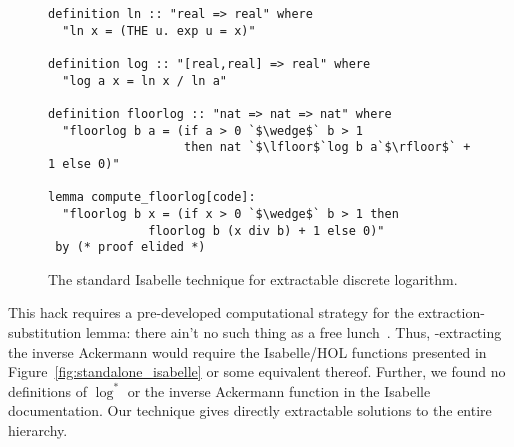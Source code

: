 \begin{figure}
\begin{lstlisting}
definition ln :: "real => real" where
  "ln x = (THE u. exp u = x)"

definition log :: "[real,real] => real" where
  "log a x = ln x / ln a"

definition floorlog :: "nat => nat => nat" where
  "floorlog b a = (if a > 0 `$\wedge$` b > 1 
                   then nat `$\lfloor$`log b a`$\rfloor$` + 1 else 0)"

lemma compute_floorlog[code]:
  "floorlog b x = (if x > 0 `$\wedge$` b > 1 then 
              floorlog b (x div b) + 1 else 0)"
 by (* proof elided *)
\end{lstlisting}
\caption{The standard Isabelle technique for extractable discrete logarithm.}
\label{fig:isabelle_hack}
\end{figure}

This hack requires a pre-developed computational strategy 
for the \li{[code]} extraction-substitution lemma: there ain't no such thing 
as a free lunch~\cite{moonmistress}. Thus, \li{[code]}-extracting the inverse 
Ackermann would require the Isabelle/HOL functions presented in Figure~\ref{fig:standalone_isabelle} or some equivalent thereof. 
Further, we found no definitions of $\log^*$ 
or the inverse Ackermann function in the Isabelle documentation. Our technique 
gives directly extractable solutions to the entire hierarchy.
\lstset{style=myStyle}

